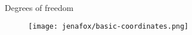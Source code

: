 \begin{frame}{Degrees of freedom~\cite{Renjewski2013}}%
    \begin{figure}[htb]%
        \centering%
        \texttt{[image: jenafox/basic-coordinates.png]}
    \end{figure}%
\end{frame}%
%